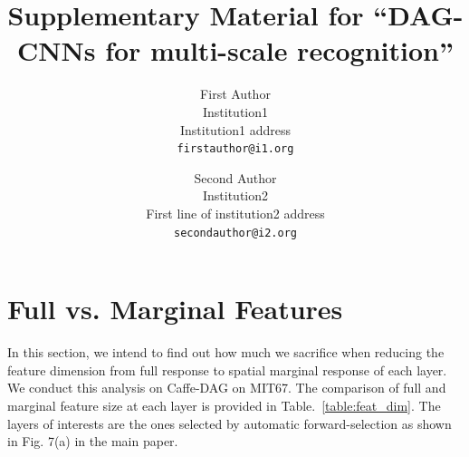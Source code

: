 \documentclass[10pt,twocolumn,letterpaper]{article}
\begin{document}
\title{Supplementary Material for ``DAG-CNNs for multi-scale recognition''}

\author{First Author\\
Institution1\\
Institution1 address\\
{\tt\small firstauthor@i1.org}
\and
Second Author\\
Institution2\\
First line of institution2 address\\
{\tt\small secondauthor@i2.org}
}

\maketitle

%

\section{Full vs. Marginal Features}

In this section, we intend to find out how much we sacrifice when reducing the feature dimension from full response to spatial marginal response of each layer. We conduct this analysis on Caffe-DAG on MIT67. The comparison of full and marginal feature size at each layer is provided in Table.~\ref{table:feat_dim}. The layers of interests are the ones selected by automatic forward-selection as shown in Fig. 7(a) in the main paper. 
\end{document}
